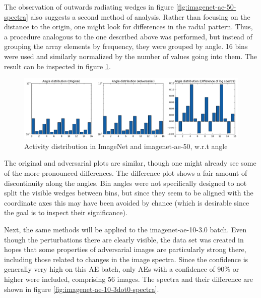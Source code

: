 \documentclass[11pt, a4paper]{article}
\begin{document}
The observation of outwards radiating wedges in figure \ref{fig:imagenet-ae-50-spectra} also suggests a second method of analysis. Rather than focusing on the distance to the origin, one might look for differences in the radial pattern. Thus, a procedure analogous to the one described above was performed, but instead of grouping the array elements by frequency, they were grouped by angle. 16 bins were used and similarly normalized by the number of values going into them. The result can be inspected in figure \ref{fig:imagenet-ae-50-angle}.

\begin{figure}[htb]
	\centering
	\includegraphics[width=\textwidth]{images/spectra/imagenet-ae-50-minconfidence-0dot5-maxorig-20000-angle-16-bins.png}
	\caption{Activity distribution in ImageNet and imagenet-ae-50, w.r.t angle}
	\label{fig:imagenet-ae-50-angle}
\end{figure}

The original and adversarial plots are similar, though one might already see some of the more pronounced differences. The difference plot shows a fair amount of discontinuity along the angles. Bin angles were not specifically designed to not split the visible wedges between bins, but since they seem to be aligned with the coordinate axes this may have been avoided by chance (which is desirable since the goal is to inspect their significance).


Next, the same methods will be applied to the imagenet-ae-10-3.0 batch. Even though the perturbations there are clearly visible, the data set was created in hopes that some properties of adversarial images are particularly strong there, including those related to changes in the image spectra. Since the confidence is generally very high on this AE batch, only AEs with a confidence of $90\%$ or higher were included, comprising 56 images. The spectra and their difference are shown in figure \ref{fig:imagenet-ae-10-3dot0-spectra}.
\end{document}
